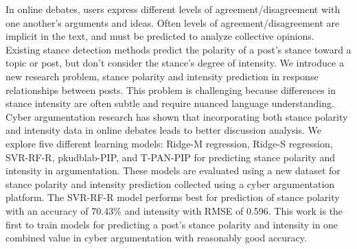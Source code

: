 In online debates, users express different levels of agreement/disagreement with one another's arguments and ideas. Often levels of agreement/disagreement are implicit in the text, and must be predicted to analyze collective opinions. Existing stance detection methods predict the polarity of a post's stance toward a topic or post, but don't consider the stance's degree of intensity. We introduce a new research problem, stance polarity and intensity prediction in response relationships between posts. This problem is challenging because differences in stance intensity are often subtle and require nuanced language understanding. Cyber argumentation research has shown that incorporating both stance polarity and intensity data in online debates leads to better discussion analysis. We explore five different learning models: Ridge-M regression, Ridge-S regression, SVR-RF-R, pkudblab-PIP, and T-PAN-PIP for predicting stance polarity and intensity in argumentation. These models are evaluated using a new dataset for stance polarity and intensity prediction collected using a cyber argumentation platform. The SVR-RF-R model performs best for prediction of stance polarity with an accuracy of 70.43\% and intensity with RMSE of 0.596. This work is the first to train models for predicting a post's stance polarity and intensity in one combined value in cyber argumentation with reasonably good accuracy.

